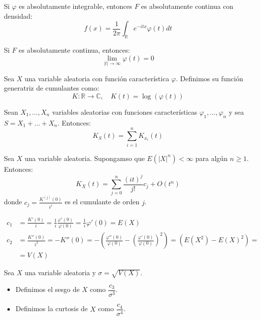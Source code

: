 \begin{theorem}
    Si $\varphi$ es absolutamente integrable, entonces $F$ es absolutamente continua con densidad:
    $$f(x) = \frac{1}{2\pi} \int_\mathbb{R} e^{-itx}\varphi(t)dt$$
\end{theorem}

\begin{theorem}
    Si $F$ es absolutamente continua, entonces:
    $$\lim\limits_{|t| \to \infty} \varphi(t) = 0$$
\end{theorem}

\begin{definition}
    Sea $X$ una variable aleatoria con función característica $\varphi$.
    Definimos su función generatriz de cumulantes como:
    $$K: \mathbb{R} \to \mathbb{C}, \quad K(t) = \log(\varphi(t))$$
\end{definition}

\begin{proposition}
    Sean $X_1, \dots, X_n$ variables aleatorias con funciones características $\varphi_1, \dots, \varphi_n$ y sea $S = X_1 + \dots + X_n$.
    Entonces:
    $$K_S(t) = \sum_{i=1}^n K_{x_i}(t)$$
\end{proposition}

\begin{theorem}
    Sea $X$ una variable aleatoria.
    Supongamso que $E(|X|^n) < \infty$ para algún $n \geq 1$.
    Entonces:
    $$K_X(t) = \sum_{j=0}^n \frac{(it)^j}{j!}c_j + O(t^n)$$
    donde $c_j = \frac{K^{(j)}(0)}{i^j}$ es el cumulante de orden $j$.
\end{theorem}

\begin{note}
    \begin{align*}
        c_1 & = \frac{K'(0)}{i} = \frac{1}{i} \frac{\varphi'(0)}{\varphi(0)} = \frac{1}{i}\varphi'(0) = E(X)                                                       \\
        c_2 & = \frac{K''(0)}{i^2} = -K''(0) = -\left(\frac{\varphi''(0)}{\varphi(0)} - \left(\frac{\varphi'(0)}{\varphi(0)}\right)^2\right) = (E(X^2) - E(X)^2) = \\
            & = V(X)
    \end{align*}
\end{note}

\begin{definition}
    Sea $X$ una variable aleatoria y $\sigma = \sqrt{V(X)}$.
    \begin{itemize}
        \item Definimos el sesgo de $X$ como $\dfrac{c_3}{\sigma^3}$.
        \item Definimos la curtosis de $X$ como $\dfrac{c_4}{\sigma^4}$.
    \end{itemize}
\end{definition}

